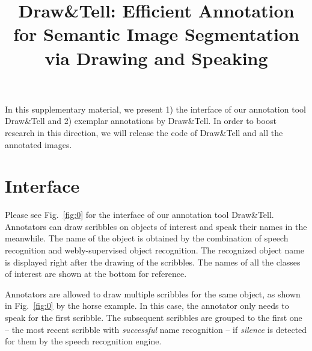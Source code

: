 \documentclass[11pt,twocolumn,letterpaper]{article}
\begin{document}
\onecolumn

\title{ Draw\&Tell: Efficient Annotation for Semantic Image Segmentation via Drawing and Speaking}

\maketitle


In this supplementary material, we present 1) the interface of our annotation tool Draw\&Tell and 2) exemplar annotations by Draw\&Tell. In order to boost research in this direction, we will release the code of Draw\&Tell and all the annotated images.

\section{Interface}
Please see Fig.~\ref{fig:0} for the interface of our annotation tool Draw\&Tell. 
Annotators can draw scribbles on objects of interest and speak their names in the meanwhile. The name of the object is obtained by the combination of speech recognition and webly-supervised object recognition. The recognized object name is displayed right after the drawing of the scribbles. The names of all the classes of interest are shown at the bottom for reference. 

Annotators are allowed to draw multiple scribbles for the same object, as shown in Fig.~\ref{fig:0} by the horse example. In this case, the annotator only needs to speak for the first scribble. The subsequent scribbles are grouped to the first one -- the most recent scribble with \emph{successful} name recognition -- if \emph{silence} is detected for them by the speech recognition engine. 
\end{document}
